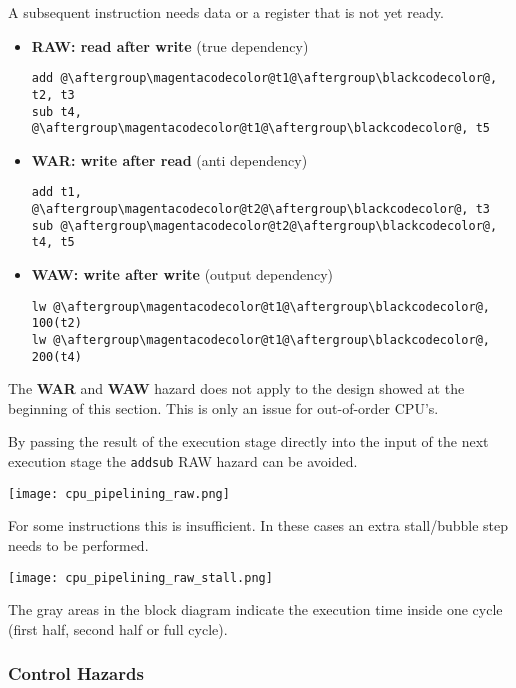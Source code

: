 \begin{multicols*}{3}
    A subsequent instruction needs data or a register that is not yet ready.

    \begin{itemize}
        \item \textbf{RAW: read after write} (true dependency)
              \begin{lstlisting}[escapechar=@]
add @\aftergroup\magentacodecolor@t1@\aftergroup\blackcodecolor@, t2, t3
sub t4, @\aftergroup\magentacodecolor@t1@\aftergroup\blackcodecolor@, t5
\end{lstlisting}
        \item \textbf{WAR: write after read} (anti dependency)
              \begin{lstlisting}[escapechar=@]
add t1, @\aftergroup\magentacodecolor@t2@\aftergroup\blackcodecolor@, t3
sub @\aftergroup\magentacodecolor@t2@\aftergroup\blackcodecolor@, t4, t5
\end{lstlisting}
        \item \textbf{WAW: write after write} (output dependency)
              \begin{lstlisting}[escapechar=@]
lw @\aftergroup\magentacodecolor@t1@\aftergroup\blackcodecolor@, 100(t2)
lw @\aftergroup\magentacodecolor@t1@\aftergroup\blackcodecolor@, 200(t4)
\end{lstlisting}
    \end{itemize}

    The \textbf{WAR} and \textbf{WAW} hazard does not apply to the design showed at the beginning of this section. This is only an issue for out-of-order CPU's.

    \newpar{}

    By passing the result of the execution stage directly into the input of the next execution stage the \texttt{add}\textleftarrow\texttt{sub} RAW hazard can be avoided.

    \texttt{[image: cpu\_pipelining\_raw.png]}

    For some instructions this is insufficient. In these cases an extra stall/bubble step needs to be performed.

    \texttt{[image: cpu\_pipelining\_raw\_stall.png]}

    The gray areas in the block diagram indicate the execution time inside one cycle (first half, second half or full cycle).

    \subsubsection{Control Hazards}\label{control hazards}


\end{multicols*}
